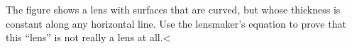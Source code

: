 The figure shows a lens with surfaces that are curved, but whose thickness is
constant along any horizontal line. Use the lensmaker's equation to prove that this ``lens'' is not really
a lens at all.<%
